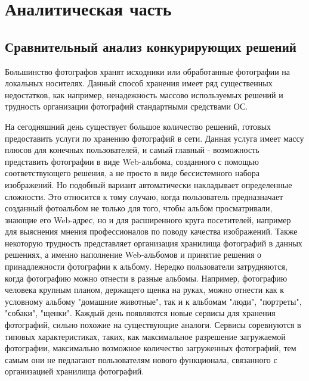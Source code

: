 \section{Аналитическая часть}\label{analytics}

\subsection{Сравнительный анализ конкурирующих решений} \label{comparsion}

Большинство фотографов хранят исходники или обработанные фотографии на локальных носителях.
Данный способ хранения имеет ряд существенных недостатков, как например, ненадежность массово используемых решений и трудность организации фотографий стандартными средствами ОС.

На сегодняшний день существует большое количество решений, готовых предоставить услуги по хранению фотографий в сети.
Данная услуга имеет массу плюсов для конечных пользователей, и самый главный  - возможность представить фотографии в виде Web-альбома, созданного с помощью соответствующего решения, а не просто в виде бессистемного набора изображений.
Но подобный вариант автоматически накладывает определенные сложности. 
Это относится к тому случаю, когда пользователь предназначает созданный фотоальбом не только для того, чтобы альбом просматривали, знающие его Web-адрес, но и для расширенного круга посетителей, например для выяснения мнения профессионалов по поводу качества изображений.
Также некоторую трудность представляет организация хранилища фотографий в данных решениях, а именно наполнение Web-альбомов и принятие решения о принадлежности фотографии к альбому. 
Нередко пользователи затрудняются, когда фотографию можно отнести в разные альбомы. Например, фотографию человека крупным планом, держащего щенка на руках, можно отнести как к условному альбому "домашние животные", так и к альбомам "люди", "портреты", "собаки", "щенки".
Каждый день появляются новые сервисы для хранения фотографий, сильно похожие на существующие аналоги.
Сервисы соревнуются в типовых характеристиках, таких, как максимальное разрешение загружаемой фотографии, максимально возможное количество загруженных фотографий, тем самым они не педлагают пользователям нового функционала, связанного с организацией хранилища фотографий.

